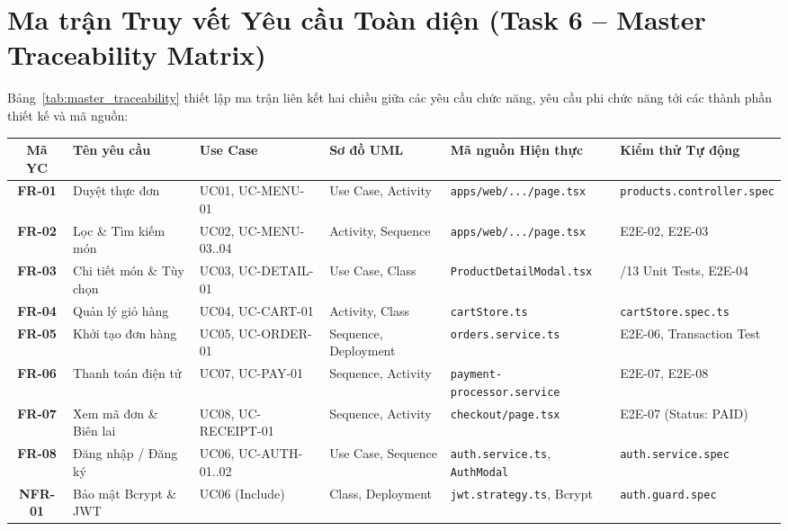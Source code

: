 \documentclass[a4paper]{article}
\begin{document}
\newpage
\section{Ma trận Truy vết Yêu cầu Toàn diện (Task 6 -- Master Traceability Matrix)}
Bảng~\ref{tab:master_traceability} thiết lập ma trận liên kết hai chiều giữa các yêu cầu chức năng, yêu cầu phi chức năng tới các thành phần thiết kế và mã nguồn:

\begin{table}[H]
\centering
\scriptsize
\begin{tabular}{|c|>{\raggedright\arraybackslash}p{2.4cm}|>{\raggedright\arraybackslash}p{2.2cm}|>{\raggedright\arraybackslash}p{2.4cm}|>{\raggedright\arraybackslash}p{3.2cm}|>{\raggedright\arraybackslash}p{2.6cm}|}
\hline
\textbf{Mã YC} & \textbf{Tên yêu cầu} & \textbf{Use Case} & \textbf{Sơ đồ UML} & \textbf{Mã nguồn Hiện thực} & \textbf{Kiểm thử Tự động} \\ \hline
\textbf{FR-01} & Duyệt thực đơn & UC01, UC-MENU-01 & Use Case, Activity & \texttt{apps/web/.../page.tsx} & \texttt{products.controller.spec} \\ \hline
\textbf{FR-02} & Lọc \& Tìm kiếm món & UC02, UC-MENU-03..04 & Activity, Sequence & \texttt{apps/web/.../page.tsx} & E2E-02, E2E-03 \\ \hline
\textbf{FR-03} & Chi tiết món \& Tùy chọn & UC03, UC-DETAIL-01 & Use Case, Class & \texttt{ProductDetailModal.tsx} & 13/13 Unit Tests, E2E-04 \\ \hline
\textbf{FR-04} & Quản lý giỏ hàng & UC04, UC-CART-01 & Activity, Class & \texttt{cartStore.ts} & \texttt{cartStore.spec.ts} \\ \hline
\textbf{FR-05} & Khởi tạo đơn hàng & UC05, UC-ORDER-01 & Sequence, Deployment & \texttt{orders.service.ts} & E2E-06, Transaction Test \\ \hline
\textbf{FR-06} & Thanh toán điện tử & UC07, UC-PAY-01 & Sequence, Activity & \texttt{payment-processor.service} & E2E-07, E2E-08 \\ \hline
\textbf{FR-07} & Xem mã đơn \& Biên lai & UC08, UC-RECEIPT-01 & Sequence, Activity & \texttt{checkout/page.tsx} & E2E-07 (Status: PAID) \\ \hline
\textbf{FR-08} & Đăng nhập / Đăng ký & UC06, UC-AUTH-01..02 & Use Case, Sequence & \texttt{auth.service.ts}, \texttt{AuthModal} & \texttt{auth.service.spec} \\ \hline
\textbf{NFR-01} & Bảo mật Bcrypt \& JWT & UC06 (Include) & Class, Deployment & \texttt{jwt.strategy.ts}, Bcrypt & \texttt{auth.guard.spec} \\ \hline

\end{tabular}
\end{table}
\end{document}
